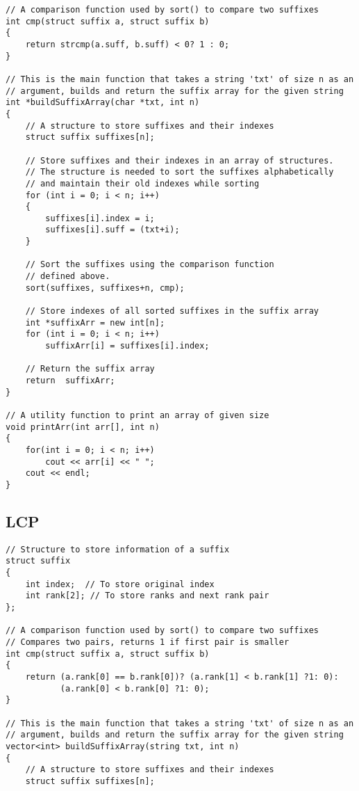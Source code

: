 \documentclass[10pt]{article}
\begin{document}
\begin{multicols*}{2}
\begin{lstlisting}[style=compactcpp]
// A comparison function used by sort() to compare two suffixes
int cmp(struct suffix a, struct suffix b)
{
    return strcmp(a.suff, b.suff) < 0? 1 : 0;
}
 
// This is the main function that takes a string 'txt' of size n as an
// argument, builds and return the suffix array for the given string
int *buildSuffixArray(char *txt, int n)
{
    // A structure to store suffixes and their indexes
    struct suffix suffixes[n];
 
    // Store suffixes and their indexes in an array of structures.
    // The structure is needed to sort the suffixes alphabetically
    // and maintain their old indexes while sorting
    for (int i = 0; i < n; i++)
    {
        suffixes[i].index = i;
        suffixes[i].suff = (txt+i);
    }
 
    // Sort the suffixes using the comparison function
    // defined above.
    sort(suffixes, suffixes+n, cmp);
 
    // Store indexes of all sorted suffixes in the suffix array
    int *suffixArr = new int[n];
    for (int i = 0; i < n; i++)
        suffixArr[i] = suffixes[i].index;
 
    // Return the suffix array
    return  suffixArr;
}
 
// A utility function to print an array of given size
void printArr(int arr[], int n)
{
    for(int i = 0; i < n; i++)
        cout << arr[i] << " ";
    cout << endl;
}
\end{lstlisting}

\subsection{LCP}

\begin{lstlisting}[style=compactcpp]
// Structure to store information of a suffix
struct suffix
{
    int index;  // To store original index
    int rank[2]; // To store ranks and next rank pair
};
 
// A comparison function used by sort() to compare two suffixes
// Compares two pairs, returns 1 if first pair is smaller
int cmp(struct suffix a, struct suffix b)
{
    return (a.rank[0] == b.rank[0])? (a.rank[1] < b.rank[1] ?1: 0):
           (a.rank[0] < b.rank[0] ?1: 0);
}
 
// This is the main function that takes a string 'txt' of size n as an
// argument, builds and return the suffix array for the given string
vector<int> buildSuffixArray(string txt, int n)
{
    // A structure to store suffixes and their indexes
    struct suffix suffixes[n];
 

\end{lstlisting}
\end{multicols*}
\end{document}
